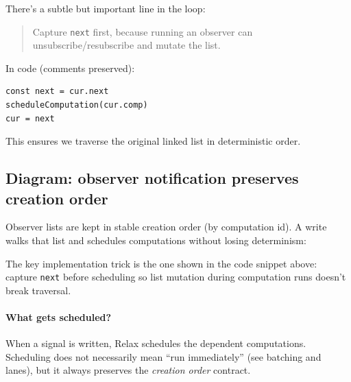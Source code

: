 There’s a subtle but important line in the loop:

\begin{quote}
Capture \texttt{next} first, because running an observer can unsubscribe/resubscribe and mutate the list.
\end{quote}

In code (comments preserved):

\begin{verbatim}
const next = cur.next
scheduleComputation(cur.comp)
cur = next
\end{verbatim}

This ensures we traverse the original linked list in deterministic order.

\subsection*{Diagram: observer notification preserves creation order}
Observer lists are kept in stable creation order (by computation id). A write walks that list and schedules computations without losing determinism:

\begin{center}
\end{center}

The key implementation trick is the one shown in the code snippet above: capture \texttt{next} before scheduling so list mutation during computation runs doesn't break traversal.

\paragraph{What gets scheduled?}

When a signal is written, Relax schedules the dependent computations.
Scheduling does not necessarily mean ``run immediately'' (see batching and lanes), but it always preserves the \emph{creation order} contract.

